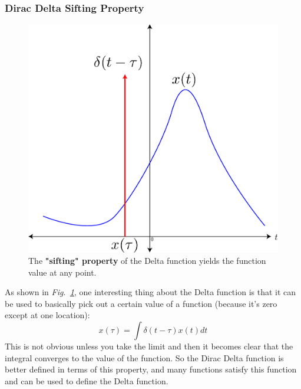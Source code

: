 \subsubsection{Dirac Delta Sifting Property}
\begin{figure}[tb]
\centering
\includegraphics[width=.5\columnwidth]{delta_sift}
\caption{The \textbf{"sifting" property} of the Delta function yields the function value at any point. }
\label{fig:delta_sift}
\end{figure}
As shown in \emph{Fig.~\ref{fig:delta_sift}}, one interesting thing about the Delta function is that it can be used to basically pick out a certain value of a function (because it's zero except at one location):
    \begin{equation}
        x\left(\tau\right)=\int\delta\left(t-\tau\right)x\left(t\right)dt
    \end{equation}
This is not obvious unless you take the limit and then it becomes clear that the integral converges to the value of the function.  So the Dirac Delta function is better defined in terms of this property, and many functions satisfy this function and can be used to define the Delta function.

